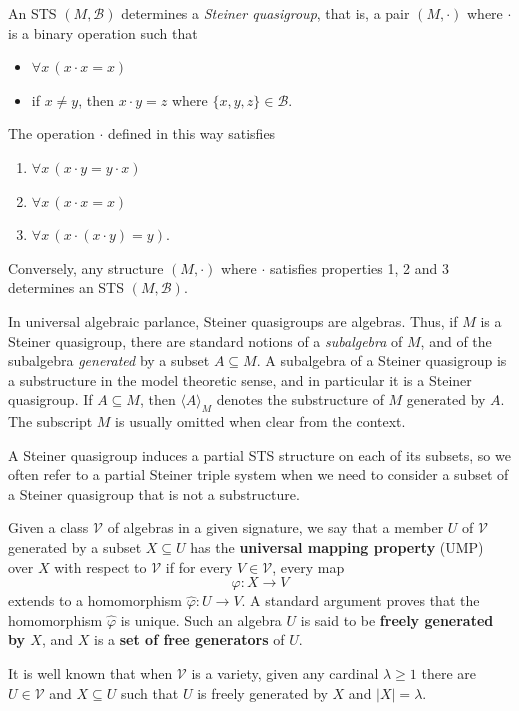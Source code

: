 \documentclass[a4paper, 11pt]{article}
\theoremstyle{note}
\begin{document}
An STS $(M, \mathcal{B})$ determines a \textit{Steiner quasigroup}, that is, a pair $(M, \cdot)$ where $\cdot$ is a binary operation such that
\begin{itemize}
\item $\forall x \, (x\cdot x =x)$
\item if $x \neq y$, then $x \cdot y = z$ where $\{x,y,z \} \in \mathcal{B}$.
\end{itemize}
The operation $\cdot$ defined in this way satisfies
 \begin{enumerate}
\item $\forall x \, (x \cdot y= y\cdot x)$
\item $\forall x \, (x\cdot x =x)$
\item $\forall x \, (x\cdot (x\cdot y)=y)$.
\end{enumerate}
Conversely, any structure $(M, \cdot)$ where $\cdot$ satisfies properties 1, 2 and 3 determines an STS $(M, \mathcal{B})$.

In universal algebraic parlance, Steiner quasigroups are algebras. Thus, if $M$ is a Steiner quasigroup, there are standard notions of a \textit{subalgebra} of $M$, and of the subalgebra \textit{generated} by a subset $A \subseteq M$. A subalgebra of a Steiner quasigroup is a substructure in the model theoretic sense, and in particular it is a Steiner quasigroup. If $A \subseteq M$, then $\langle A \rangle_M$ denotes the substructure of $M$ generated by $A$. The subscript $M$ is usually omitted when clear  from the context.

A Steiner quasigroup induces a partial STS structure on each of its subsets, so we often refer to a partial Steiner triple system when we need to consider a subset of a Steiner quasigroup that is not a substructure.

Given a class  $\mathcal{V}$ of algebras in a given signature, we say that a member $U$ of $\mathcal{V}$ generated by a subset $X \subseteq U$ has the  \textbf{universal mapping property} (UMP) over $X$ with respect to $\mathcal{V}$ if for every $V \in \mathcal{V}$, every map
 \[ \varphi : X \to V \]
extends to a homomorphism $ \hat{\varphi} : U \to V $. A standard argument proves that the homomorphism $\hat{\varphi}$ is unique. Such an algebra $U$ is said to be \textbf{freely generated by $X$}, and $X$ is a \textbf{set of free generators} of $U$. 

It is well known that when $\mathcal{V}$ is a variety, given any cardinal $\lambda \geq 1$ there are $U \in \mathcal{V}$ and $X \subseteq U$ such that $U$ is freely generated by $X $ and $|X|= \lambda$.
\end{document}
